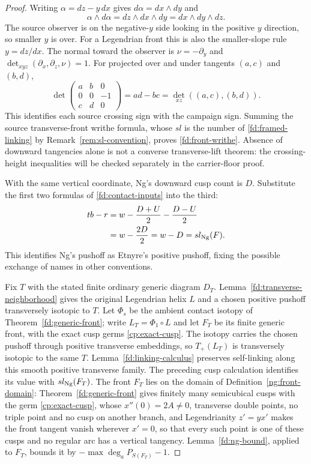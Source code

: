 \begin{proof}
Writing $\alpha=dz-y\,dx$ gives $d\alpha=dx\wedge dy$ and
\begin{equation}
 \alpha\wedge d\alpha=dz\wedge dx\wedge dy=dx\wedge dy\wedge dz.
\end{equation}
The source observer is on the negative-$y$ side looking in the positive
$y$ direction, so smaller $y$ is over. For a Legendrian front this is also
the smaller-slope rule $y=dz/dx$. The normal toward the observer is
$\nu=-\partial_y$ and
$\det_{xyz}(\partial_x,\partial_z,\nu)=1$.
For projected over and under tangents $(a,c)$ and $(b,d)$,
\begin{equation}
 \det\begin{pmatrix}a&b&0\\0&0&-1\\c&d&0\end{pmatrix}
 =ad-bc=\det_{xz}((a,c),(b,d)).
\end{equation}
This identifies each source crossing sign with the campaign sign.
Summing the source transverse-front writhe formula, whose $sl$ is the
number of \eqref{fd:framed-linking} by Remark~\ref{rem:sl-convention},
proves \eqref{fd:front-writhe}. Absence of downward tangencies alone is not a
converse transverse-lift theorem: the crossing-height inequalities will be
checked separately in the carrier-floor proof.

With the same vertical coordinate, Ng's downward cusp count is $D$.
Substitute the first two formulas of \eqref{fd:contact-inputs} into the third:
\begin{align}
 tb-r&=w-\frac{D+U}{2}-\frac{D-U}{2}\notag\\
     &=w-\frac{2D}{2}=w-D=sl_{\rm Ng}(F).
\end{align}
This identifies Ng's pushoff as Etnyre's positive pushoff, fixing the
possible exchange of names in other conventions.

Fix $T$ with the stated finite ordinary generic diagram $D_T$.
Lemma~\ref{fd:transverse-neighborhood} gives the original Legendrian
helix $L$ and a chosen positive pushoff transversely isotopic to $T$.
Let $\Phi_s$ be the ambient contact isotopy of
Theorem~\ref{fd:generic-front}; write $L_T=\Phi_1\circ L$ and let
$F_T$ be its finite generic front, with the exact cusp germs
\eqref{cp:exact-cusp}. The isotopy carries the chosen pushoff through
positive transverse embeddings, so $T_+(L_T)$ is transversely isotopic
to the same $T$. Lemma~\ref{fd:linking-calculus} preserves self-linking
along this smooth positive transverse family. The preceding cusp
calculation identifies its value with $sl_{\rm Ng}(F_T)$. The front
$F_T$ lies on the domain of Definition~\ref{ng:front-domain}:
Theorem~\ref{fd:generic-front} gives finitely many semicubical cusps with
the germ \eqref{cp:exact-cusp}, whose $x''(0)=2A\neq0$, transverse double
points, no triple point and no cusp on another branch, and Legendrianity
$z'=yx'$ makes the front tangent vanish wherever $x'=0$, so that every such
point is one of these cusps and no regular arc has a vertical tangency.
Lemma~\ref{fd:ng-bound}, applied to $F_T$, bounds it by
$-\max\deg_a P_{S(F_T)}-1$.


\end{proof}
